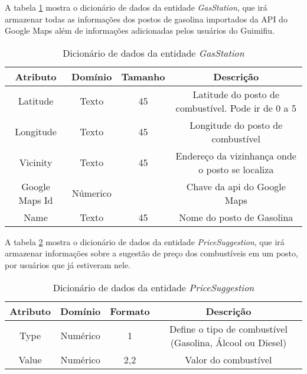 A tabela \ref{dic:gas_station} mostra o dicionário de dados da entidade \textit{GasStation}, que irá armazenar todas as informações dos postos de gasolina importados da API do Google Maps além de informações adicionadas pelos usuários do Guimifiu.
\begin{table}[H]
\centering
\caption{Dicionário de dados da entidade \textit{GasStation}}
\label{dic:gas_station}
\begin{tabular}{cccc}
\toprule
\textbf{Atributo} & \textbf{Domínio} & \textbf{Tamanho} & \textbf{Descrição} \\
\midrule
Latitude                        & Texto                          & 45                             & Latitude do posto de combustível. Pode ir de 0 a 5                 \\
Longitude                       & Texto                          & 45                             & Longitude do posto de combustível\\
Vicinity                        & Texto                          & 45                             & Endereço da vizinhança onde o posto se localiza \\
Google Maps Id                  & Númerico                       &                                & Chave da api do Google Maps      \\
Name                            & Texto                          & 45                             & Nome do posto de Gasolina\\
\bottomrule
\end{tabular}
\end{table}

A tabela \ref{dic:pricesuggestion} mostra o dicionário de dados da entidade \textit{PriceSuggestion}, que irá armazenar informações sobre a sugestão de preço dos combustíveis em um posto, por usuários que já estiveram nele.
\begin{table}[H]
\centering
\caption{Dicionário de dados da entidade \textit{PriceSuggestion}}
\label{dic:pricesuggestion}
\begin{tabular}{cccc}
\toprule
\textbf{Atributo} & \textbf{Domínio} & \textbf{Formato} & \textbf{Descrição} \\
\midrule
Type                            & Numérico                       & 1                              & Define o tipo de combustível (Gasolina, Álcool ou Diesel)\\
Value                           & Numérico                       & 2,2                          & Valor do combustível\\
\bottomrule
\end{tabular}
\end{table}

